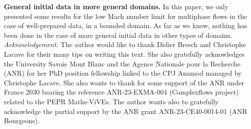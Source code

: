 \documentclass[11pt, twoside, a4paper]{article}
\theoremstyle{plain}
\theoremstyle{remark}
\numberwithin{equation}{section}
\begin{document}
\textbf{General initial data in more general domains.} In this paper, we only presented some results for the low Mach number limit for multiphase flows in the case of well-prepared data, in a bounded domain. As far as we know, nothing has been done in the case of more general initial data in other types of domains.\\


\textit{Acknowledgement.} The author would like to thank Didier Bresch and Christophe Lacave for their many tips on writing this text.
She also gratefully acknowledges the University Savoie Mont Blanc and the Agence Nationale pour la Recherche (ANR) for her PhD position fellowship linked to the CPJ Anamod managed by Christophe Lacave. She also wants to thank for some support of the ANR under France 2030 bearing the reference ANR-23-EXMA-004 (Complexflows project) related to the PEPR Maths-ViVEs. The author wants also to gratefully acknowledge the partial support by the ANR grant ANR-23-CE40-0014-01 (ANR Bourgeons).




%
%
\end{document}
